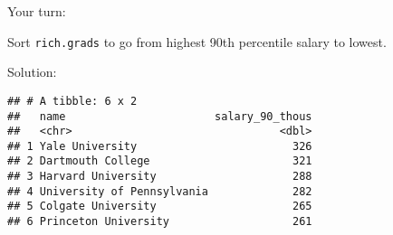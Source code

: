 \documentclass[ignorenonframetext,]{beamer}
\newenvironment{Shaded}{\begin{snugshade}}{\end{snugshade}}
\newcommand{\KeywordTok}[1]{\textcolor[rgb]{0.13,0.29,0.53}{\textbf{#1}}}
\newcommand{\StringTok}[1]{\textcolor[rgb]{0.31,0.60,0.02}{#1}}
\newcommand{\CommentTok}[1]{\textcolor[rgb]{0.56,0.35,0.01}{\textit{#1}}}
\newcommand{\OperatorTok}[1]{\textcolor[rgb]{0.81,0.36,0.00}{\textbf{#1}}}
\newcommand{\NormalTok}[1]{#1}
\begin{document}
\begin{frame}[fragile]{Your turn:}

Sort \texttt{rich.grads} to go from highest 90th percentile salary to
lowest.

\end{frame}

\begin{frame}[fragile]{Solution:}

\begin{Shaded}
\end{Shaded}

\begin{verbatim}
## # A tibble: 6 x 2
##   name                       salary_90_thous
##   <chr>                                <dbl>
## 1 Yale University                        326
## 2 Dartmouth College                      321
## 3 Harvard University                     288
## 4 University of Pennsylvania             282
## 5 Colgate University                     265
## 6 Princeton University                   261
\end{verbatim}

\end{frame}
\end{document}
